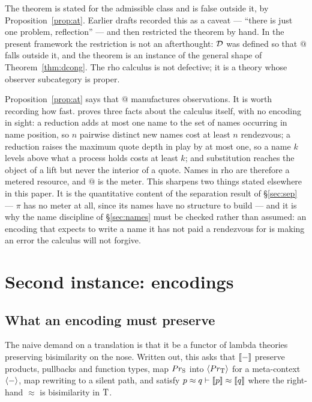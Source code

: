 \documentclass{article}
\begin{document}
\begin{remark}
    The theorem is stated for the admissible class and is false outside it, by Proposition~\ref{prop:at}. Earlier drafts recorded this as a caveat --- ``there is just one problem, reflection'' --- and then restricted the theorem by hand. In the present framework the restriction is not an afterthought: $\mathcal{D}$ was defined so that $@$ falls outside it, and the theorem is an instance of the general shape of Theorem~\ref{thm:dcong}. The rho calculus is not defective; it is a theory whose observer subcategory is proper.

\begin{remark}
\label{rem:metered}
    Proposition~\ref{prop:at} says that $@$ manufactures observations. It is worth recording how fast.  proves three facts about the calculus itself, with no encoding in sight: a reduction adds at most one name to the set of names occurring in name position, so $n$ pairwise distinct new names cost at least $n$ rendezvous; a reduction raises the maximum quote depth in play by at most one, so a name $k$ levels above what a process holds costs at least $k$; and substitution reaches the object of a lift but never the interior of a quote. Names in rho are therefore a metered resource, and $@$ is the meter. This sharpens two things stated elsewhere in this paper. It is the quantitative content of the separation result of \S\ref{sec:sep} --- $\pi$ has no meter at all, since its names have no structure to build --- and it is why the name discipline of \S\ref{sec:names} must be checked rather than assumed: an encoding that expects to write a name it has not paid a rendezvous for is making an error the calculus will not forgive.
\end{remark}
\end{remark}

\section{Second instance: encodings}
\label{sec:enc}

\subsection{What an encoding must preserve}

The naive demand on a translation is that it be a functor of lambda theories preserving bisimilarity on the nose. Written out, this asks that $[\![-]\!]$ preserve products, pullbacks and function types, map $Pr_{\mathrm{S}}$ into $\langle Pr_{\mathrm{T}}\rangle$ for a meta-context $\langle -\rangle$, map rewriting to a silent path, and satisfy $p\approx q\vdash[\![p]\!]\approx[\![q]\!]$ where the right-hand $\approx$ is bisimilarity in $\mathrm{T}$.
\end{document}
